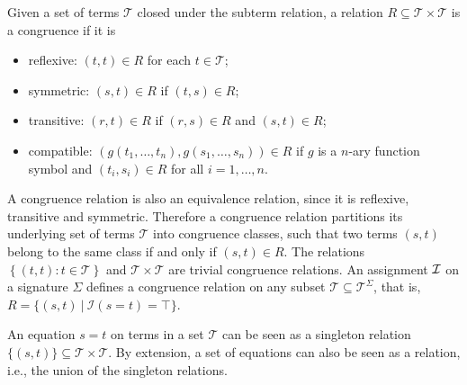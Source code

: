 \documentclass[smallextended]{svjour3}
\begin{document}
%
%
\begin{definition}  Given a set of terms $\mathcal{T}$ closed under the subterm relation, a relation $R \subseteq \mathcal{T} \times \mathcal{T}$ is a congruence if it is
\begin{itemize}
\item reflexive: $(t,t) \in R$ for each $t \in \mathcal{T}$;
\item symmetric: $(s,t) \in R$ if $(t,s) \in R$;
\item transitive:  $(r,t) \in R$ if $(r,s) \in R$ and $(s,t) \in R$;
\item compatible: $(g(t_1,\ldots,t_n),g(s_1,\ldots,s_n)) \in R$ if  $g$ is a $n$-ary function symbol and $(t_i,s_i) \in R$  for all $i = 1,\ldots,n$.
\end{itemize}

\end{definition}
\noindent A congruence relation is also an equivalence relation, since it is
reflexive, transitive and symmetric.  Therefore a congruence relation partitions
its underlying set of terms $\mathcal{T}$ into congruence classes, such that two
terms $(s,t)$ belong to the same class if and only if $(s,t) \in R$.  The
relations $\left\{{\left({t, t}\right): t \in \mathcal{T}}\right\}$ and $\mathcal{T} \times \mathcal{T}$ are trivial
congruence relations.  An assignment $\cal I$ on a signature $\Sigma$ defines a congruence relation on any subset $\mathcal{T}\subseteq\mathcal{T}^\Sigma$, that is, $R = \{(s,t) \ |\ \mathcal{I}(s = t) = \top \}$.

An equation $s = t$ on terms in a set $\mathcal{T}$ can be seen as a singleton relation $\{(s,t)\} \subseteq \mathcal{T} \times \mathcal{T}$.  By extension, a set of equations can also be seen as a relation, i.e., the union of the singleton relations. 
\end{document}
